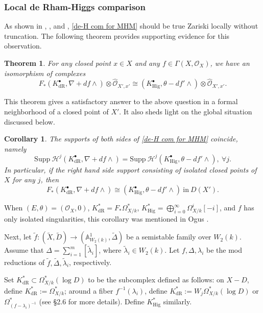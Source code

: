\documentclass[12pt, a4paper]{article}
\newtheorem{theorem}{Theorem}[section]
\newtheorem{corollary}{Corollary}[section]
\begin{document}
\subsubsection{Local de Rham-Higgs comparison}
As shown in \cite[Remarques 2.2 (ii)]{DI}, \cite[Theorem 2.26, 2]{OV}, \cite[Theorem 5.2 (ii)]{Schepler} and \cite[Proposition 3.8]{SZ2}, \eqref{de-H com for MHM} should be true Zariski locally without truncation. The following theorem provides supporting evidence for this observation.
\fi


\begin{theorem}\label{de Rham-Higgs local}
For any closed point $x\in X$ and any $f\in\Gamma(X,\mathcal O_X)$, we have an isomorphism of complexes
$$
F_*(K^\bullet_{\mathrm{dR}},\nabla+df\wedge)\otimes\hat{\mathcal O}_{X',x'}\cong(K^\bullet_{\mathrm{Hig}},\theta-df'\wedge)\otimes\hat{\mathcal O}_{X',x'}.
$$
\end{theorem}
This theorem gives a satisfactory answer to the above question in a formal neighborhood of a closed point of $X'$. It also sheds light on the global situation discussed below.

\begin{corollary}
The supports of both sides of \eqref{de-H com for MHM} coincide, namely
$$\mathrm{Supp}~\mathcal H^j(K^\bullet_{\mathrm{dR}},\nabla+df\wedge)=\mathrm{Supp}~\mathcal H^j(K^\bullet_{\mathrm{Hig}},\theta-df'\wedge),~\forall j.$$
In particular, if the right hand side support consisting of isolated closed points of $X$ for any $j$, then
$$
F_*(K^\bullet_{\mathrm{dR}},\nabla+df\wedge)\cong(K^\bullet_{\mathrm{Hig}},\theta-df'\wedge)~\mathrm{in}~D(X').
$$
\end{corollary}
When $(E,\theta)=(\mathcal O_X,0)$, $K^*_{\mathrm{dR}}=F_*\Omega^*_{X/k}$, $K^*_{\mathrm{Hig}}=\bigoplus_{i=0}^\infty\Omega^i_{X/k}[-i]$, and $f$ has only isolated singularities, this corollary was mentioned in Ogus \cite{Ogus04}.

Next, let $\tilde{f}: (\tilde{X},\tilde D) \to (\mathbb{A}^1_{W_2(k)},\tilde\Delta)$ be a semistable family over $W_2(k)$. Assume that $\Delta=\sum_{i=1}^m[\tilde \lambda_i]$, where $\tilde\lambda_i\in W_2(k)$. Let $f,\Delta,\lambda_i$ be the mod reductions of $\tilde f,\tilde\Delta,\tilde\lambda_i$, respectively. 

Set $K^*_{\mathrm{dR}} \subset \Omega^*_{X/k}(\log D)$ to be the subcomplex defined as follows: on $X-D$, define $K^*_{\mathrm{dR}} := \Omega^*_{X/k}$; around a fiber $f^{-1}(\lambda_i)$, define $K^*_{\mathrm{dR}} := W_j\Omega^*_{X/k}(\log D)$ or $\Omega^*_{(f - \lambda_i)^{-1}}$ (see \S2.6 for more details). Define $K^*_{\mathrm{Hig}}$ similarly.
\end{document}
